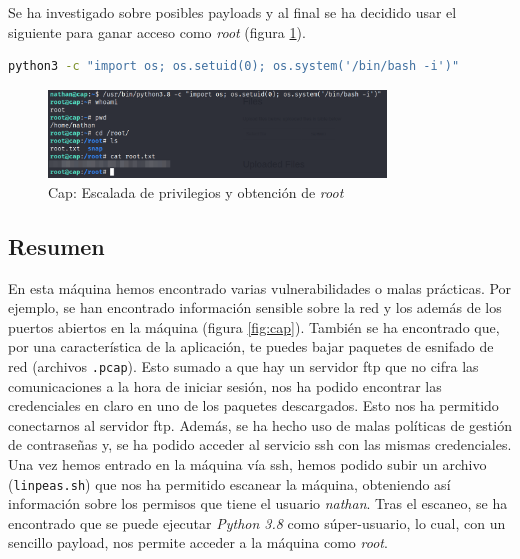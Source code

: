 Se ha investigado sobre posibles payloads y al final se ha decidido usar el siguiente para ganar acceso como \textit{root} (figura \ref{fig:cap-root}).
\begin{lstlisting}[language=bash]
python3 -c "import os; os.setuid(0); os.system('/bin/bash -i')"
\end{lstlisting}

\begin{figure}[h]
    \centering
    \includegraphics[width=0.8\textwidth]{images/machines/cap/root.png}
    \caption{Cap: Escalada de privilegios y obtención de \textit{root}}
    \label{fig:cap-root}
\end{figure}

\newpage

\subsection{Resumen}

En esta máquina hemos encontrado varias vulnerabilidades o malas prácticas. Por ejemplo, se han encontrado información sensible sobre la red y los además de los puertos abiertos en la máquina (figura \ref{fig:cap}). También se ha encontrado que, por una característica de la aplicación, te puedes bajar paquetes de esnifado de red (archivos \texttt{.pcap}). Esto sumado a que hay un servidor \acrshort{ftp} que no cifra las comunicaciones a la hora de iniciar sesión, nos ha podido encontrar las credenciales en claro en uno de los paquetes descargados. Esto nos ha permitido conectarnos al servidor \acrshort{ftp}. Además, se ha hecho uso de malas políticas de gestión de contraseñas y, se ha podido acceder al servicio \acrshort{ssh} con las mismas credenciales.\\

Una vez hemos entrado en la máquina vía \acrshort{ssh}, hemos podido subir un archivo (\texttt{linpeas.sh}) que nos ha permitido escanear la máquina, obteniendo así información sobre los permisos que tiene el usuario \textit{nathan}. Tras el escaneo, se ha encontrado que se puede ejecutar \textit{Python 3.8} como súper-usuario, lo cual, con un sencillo payload, nos permite acceder a la máquina como \textit{root}.
